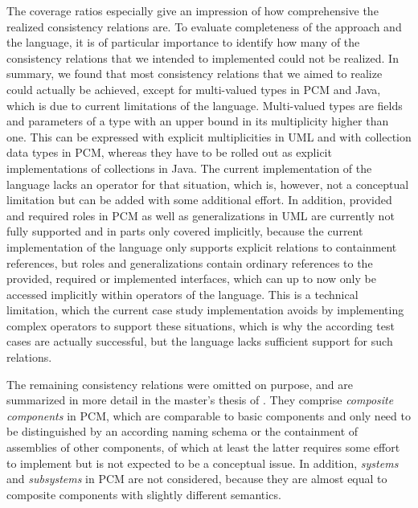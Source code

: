 The coverage ratios especially give an impression of how comprehensive the realized consistency relations are.
To evaluate completeness of the \commonalities approach and the language, it is of particular importance to identify how many of the consistency relations that we intended to implemented could not be realized.
In summary, we found that most consistency relations that we aimed to realize could actually be achieved, except for multi-valued types in \gls{PCM} and Java, which is due to current limitations of the language.
Multi-valued types are fields and parameters of a type with an upper bound in its multiplicity higher than one.
This can be expressed with explicit multiplicities in \gls{UML} and with collection data types in \gls{PCM}, whereas they have to be rolled out as explicit implementations of collections in Java.
The current implementation of the \commonalities language lacks an operator for that situation, which is, however, not a conceptual limitation but can be added with some additional effort.
In addition, provided and required roles in \gls{PCM} as well as generalizations in \gls{UML} are currently not fully supported and in parts only covered implicitly, because the current implementation of the \commonalities language only supports explicit relations to containment references, but roles and generalizations contain ordinary references to the provided, required or implemented interfaces, which can up to now only be accessed implicitly within operators of the \commonalities language.
This is a technical limitation, which the current case study implementation avoids by implementing complex operators to support these situations, which is why the according test cases are actually successful, but the language lacks sufficient support for such relations.

The remaining consistency relations were omitted on purpose, and are summarized in more detail in the master's thesis of \textcite[Sec. 3]{hennig2020ma}.
They comprise \emph{composite components} in \gls{PCM}, which are comparable to basic components and only need to be distinguished by an according naming schema or the containment of assemblies of other components, of which at least the latter requires some effort to implement but is not expected to be a conceptual issue.
In addition, \emph{systems} and \emph{subsystems} in \gls{PCM} are not considered, because they are almost equal to composite components with slightly different semantics.

